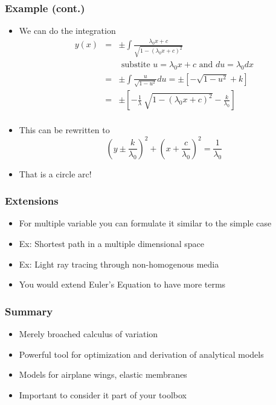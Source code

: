\documentclass[10pt]{beamer}
\begin{document}
\begin{frame}
  \frametitle{Example (cont.)}
  \begin{itemize}
  \item We can do the integration
    \[
      \begin{array}{rcl}
        y(x) &=& \pm \int \frac{\lambda_0 x + c}{\sqrt{1 - (\lambda_0 x +c )^2}}\\
             && \mbox{ substite } u = \lambda_0 x + c \mbox{ and } du = \lambda_0 dx \\
             &=& \pm \int \frac{u}{\sqrt{1-u^2}} du = \pm \left[ - \sqrt{1-u^2} + k \right] \\
             &=& \pm \left[ - \frac{ 1 }{ \lambda } ~  \sqrt{ 1 - ( \lambda_0 x + c )^2}   - \frac{k}{\lambda_0} \right]\\
      \end{array}
    \]
  \item This can be rewritten to
    \[
      \left( y \pm \frac{k}{\lambda_0} \right)^2  +
      \left( x + \frac{c}{\lambda_0} \right)^2 =
      \frac{1}{\lambda_0}
    \]
  \item That is a circle arc!
  \end{itemize}
\end{frame}

\begin{frame}
  \frametitle{Extensions}
  \begin{itemize}
  \item For multiple variable you can formulate it similar to the simple case
  \item Ex: Shortest path in a multiple dimensional space
  \item Ex: Light ray tracing through non-homogenous media
  \item You would extend Euler's Equation to have more terms
  \end{itemize}
\end{frame}

\begin{frame}
  \frametitle{Summary}
  \begin{itemize}
  \item Merely broached calculus of variation
  \item Powerful tool for optimization and derivation of analytical models
  \item Models for airplane wings, elastic membranes
  \item Important to consider it part of your toolbox
  \end{itemize}
\end{frame}
\end{document}
